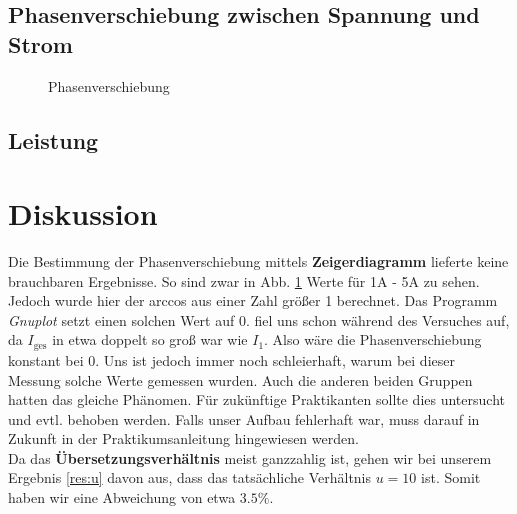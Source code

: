 \documentclass[12pt,a4paper,titlepage,headinclude,bibtotoc]{scrartcl}
\begin{document}
\subsection{Phasenverschiebung zwischen Spannung und Strom}
\begin{figure}[!htb]
	\centering
	
	\caption{Phasenverschiebung}
	\label{fig:Phase}
\end{figure}

\subsection{Leistung}

\section{Diskussion}
\label{sec:diskussion}
Die Bestimmung der Phasenverschiebung mittels \textbf{Zeigerdiagramm} lieferte keine brauchbaren Ergebnisse.
So sind zwar in Abb. \ref{fig:Phase} Werte für 1A - 5A zu sehen.
Jedoch wurde hier der arccos aus einer Zahl größer 1 berechnet.
Das Programm \textit{Gnuplot} setzt einen solchen Wert auf 0. 
 fiel uns schon während des Versuches auf, da $I_\text{ges}$ in etwa doppelt so groß war wie $I_1$.
Also wäre die Phasenverschiebung konstant bei 0.
Uns ist jedoch immer noch schleierhaft, warum bei dieser Messung solche Werte gemessen wurden.
Auch die anderen beiden Gruppen hatten das gleiche Phänomen.
Für zukünftige Praktikanten sollte dies untersucht und evtl. behoben werden.
Falls unser Aufbau fehlerhaft war, muss darauf in Zukunft in der Praktikumsanleitung hingewiesen werden.\\

Da das \textbf{Übersetzungsverhältnis} meist ganzzahlig ist, gehen wir bei unserem Ergebnis \eqref{res:u} davon aus, dass das tatsächliche Verhältnis $u=10$ ist.
Somit haben wir eine Abweichung von etwa $3.5\%$.
\end{document}
